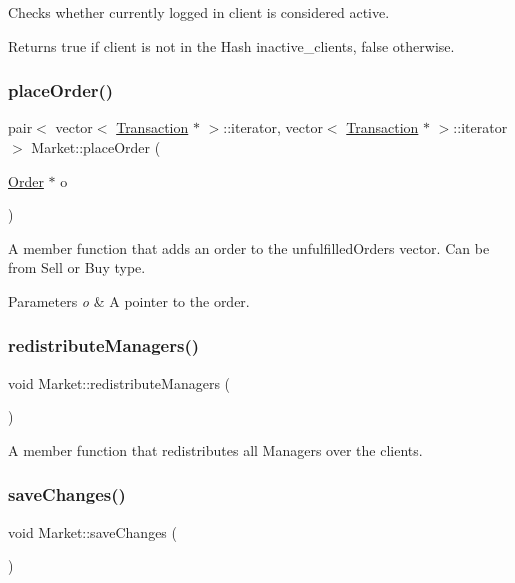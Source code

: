 Checks whether currently logged in client is considered active. \begin{DoxyReturn}{Returns}
true if client is not in the Hash inactive\+\_\+clients, false otherwise. 
\end{DoxyReturn}
\hypertarget{class_market_adbc97b770d67a3af3258737a00112dc0}{}\label{class_market_adbc97b770d67a3af3258737a00112dc0} 
\subsubsection{\texorpdfstring{place\+Order()}{placeOrder()}}
{\footnotesize\ttfamily pair$<$ vector$<$ \hyperlink{class_transaction}{Transaction} $\ast$ $>$\+::iterator, vector$<$ \hyperlink{class_transaction}{Transaction} $\ast$ $>$\+::iterator $>$ Market\+::place\+Order (\begin{DoxyParamCaption}\item[{\hyperlink{class_order}{Order} $\ast$}]{o }\end{DoxyParamCaption})}

A member function that adds an order to the unfulfilled\+Orders vector. Can be from Sell or Buy type. 
\begin{DoxyParams}{Parameters}
{\em o} & A pointer to the order. \\
\hline
\end{DoxyParams}
\hypertarget{class_market_af1966f2ec86347b1fbfc085d8e5c2781}{}\label{class_market_af1966f2ec86347b1fbfc085d8e5c2781} 
\subsubsection{\texorpdfstring{redistribute\+Managers()}{redistributeManagers()}}
{\footnotesize\ttfamily void Market\+::redistribute\+Managers (\begin{DoxyParamCaption}{ }\end{DoxyParamCaption})}

A member function that redistributes all Managers over the clients. \hypertarget{class_market_abbd4b3c218551e7fcce39cd7916aa35e}{}\label{class_market_abbd4b3c218551e7fcce39cd7916aa35e} 
\subsubsection{\texorpdfstring{save\+Changes()}{saveChanges()}}
{\footnotesize\ttfamily void Market\+::save\+Changes (\begin{DoxyParamCaption}{ }\end{DoxyParamCaption})}

